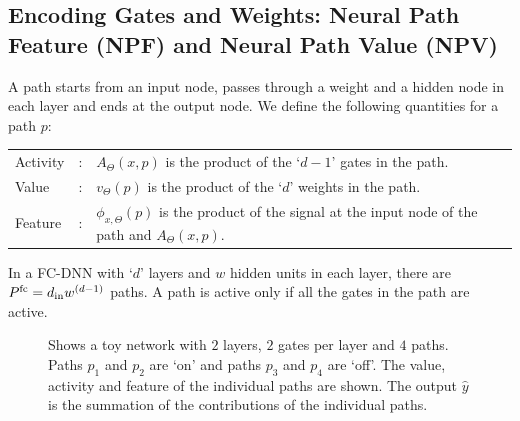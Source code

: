 \subsection{Encoding Gates and Weights: Neural Path Feature (NPF) and Neural Path Value (NPV)}
\begin{definition}
A path starts from an input node, passes through a weight and a hidden node in each layer and ends at the output node. We define the following quantities for a path $p$:
\begin{tabular}{lcl}
 Activity&:& $A_{\Theta}(x,p)$ is the product of the `$d-1$' gates in the path. \\
Value&:& $v_{\Theta}(p)$ is the product of the `$d$' weights in the path.\\
Feature&:&   $\phi_{x,\Theta}(p)$ is the product of the signal at the input node of the path and $A_{\Theta}(x,p)$.\\
\end{tabular}
\end{definition}
In a FC-DNN with `$d$' layers and  $w$  hidden units in each layer, there are $P^{\text{fc}}=d_{\text{in}} w^{(d-1)}$ paths. A path is active only if all the gates in the path are active.
\begin{figure}[h]
\caption{Shows a toy network with $2$ layers, $2$ gates per layer and $4$ paths. Paths $p_1$ and $p_2$ are `on' and paths $p_3$ and $p_4$ are `off'. The value, activity and feature of the individual paths are shown. The output $\hat{y}$ is the summation of the contributions of the individual paths.}
\end{figure}
